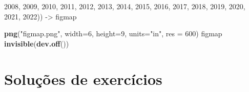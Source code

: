 \documentclass[
]{article}
\newenvironment{Shaded}{\begin{snugshade}}{\end{snugshade}}
\newcommand{\AttributeTok}[1]{\textcolor[rgb]{0.13,0.29,0.53}{#1}}
\newcommand{\DecValTok}[1]{\textcolor[rgb]{0.00,0.00,0.81}{#1}}
\newcommand{\FunctionTok}[1]{\textcolor[rgb]{0.13,0.29,0.53}{\textbf{#1}}}
\newcommand{\NormalTok}[1]{#1}
\newcommand{\OtherTok}[1]{\textcolor[rgb]{0.56,0.35,0.01}{#1}}
\newcommand{\StringTok}[1]{\textcolor[rgb]{0.31,0.60,0.02}{#1}}
\begin{document}
\begin{Shaded}
\begin{Highlighting}[]
                             \StringTok{\textquotesingle{}2008\textquotesingle{}}\NormalTok{, }\StringTok{\textquotesingle{}2009\textquotesingle{}}\NormalTok{, }\StringTok{\textquotesingle{}2010\textquotesingle{}}\NormalTok{, }\StringTok{\textquotesingle{}2011\textquotesingle{}}\NormalTok{, }\StringTok{\textquotesingle{}2012\textquotesingle{}}\NormalTok{, }
                             \StringTok{\textquotesingle{}2013\textquotesingle{}}\NormalTok{, }\StringTok{\textquotesingle{}2014\textquotesingle{}}\NormalTok{, }\StringTok{\textquotesingle{}2015\textquotesingle{}}\NormalTok{,}
                             \StringTok{\textquotesingle{}2016\textquotesingle{}}\NormalTok{, }\StringTok{\textquotesingle{}2017\textquotesingle{}}\NormalTok{, }\StringTok{\textquotesingle{}2018\textquotesingle{}}\NormalTok{, }\StringTok{\textquotesingle{}2019\textquotesingle{}}\NormalTok{, }
                             \StringTok{\textquotesingle{}2020\textquotesingle{}}\NormalTok{, }\StringTok{\textquotesingle{}2021\textquotesingle{}}\NormalTok{, }\StringTok{\textquotesingle{}2022\textquotesingle{}}\NormalTok{)) }\OtherTok{{-}\textgreater{}}\NormalTok{ figmap}

\FunctionTok{png}\NormalTok{(}\StringTok{"figmap.png"}\NormalTok{, }\AttributeTok{width=}\DecValTok{6}\NormalTok{, }\AttributeTok{height=}\DecValTok{9}\NormalTok{, }
    \AttributeTok{units=}\StringTok{"in"}\NormalTok{, }\AttributeTok{res =} \DecValTok{600}\NormalTok{)}
\NormalTok{figmap}
\FunctionTok{invisible}\NormalTok{(}\FunctionTok{dev.off}\NormalTok{())}
\end{Highlighting}
\end{Shaded}

\hypertarget{soluuxe7uxf5es-de-exercuxedcios}{%
\section{Soluções de exercícios}\label{soluuxe7uxf5es-de-exercuxedcios}}
\end{document}
